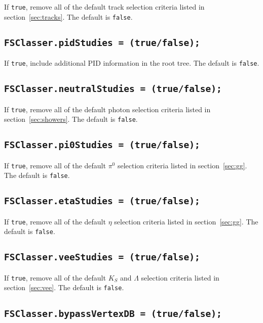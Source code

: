 \documentclass[11pt,a4paper]{define/cepcnote}
\begin{document}
If {\tt true}, remove all of the default track selection criteria listed in section~\ref{sec:tracks}.  The default is {\tt false}.


\subsection{\tt FSClasser.pidStudies = (true/false);}
\label{sec:pidparameter}

If {\tt true}, include additional PID information in the root tree.  The default is {\tt false}.


\subsection{\tt FSClasser.neutralStudies = (true/false);}
\label{sec:neutralparameter}

If {\tt true}, remove all of the default photon selection criteria listed in section~\ref{sec:showers}.  The default is {\tt false}.

\subsection{\tt FSClasser.pi0Studies = (true/false);}
\label{sec:pi0parameter}

If {\tt true}, remove all of the default $\pi^0$ selection criteria listed in section~\ref{sec:gg}.  The default is {\tt false}.

\subsection{\tt FSClasser.etaStudies = (true/false);}
\label{sec:etaparameter}

If {\tt true}, remove all of the default $\eta$ selection criteria listed in section~\ref{sec:gg}.  The default is {\tt false}.

\subsection{\tt FSClasser.veeStudies = (true/false);}
\label{sec:veeparameter}

If {\tt true}, remove all of the default $K_S$ and $\Lambda$ selection criteria listed in section~\ref{sec:vee}.  The default is {\tt false}.

\subsection{\tt FSClasser.bypassVertexDB = (true/false);}
\end{document}

